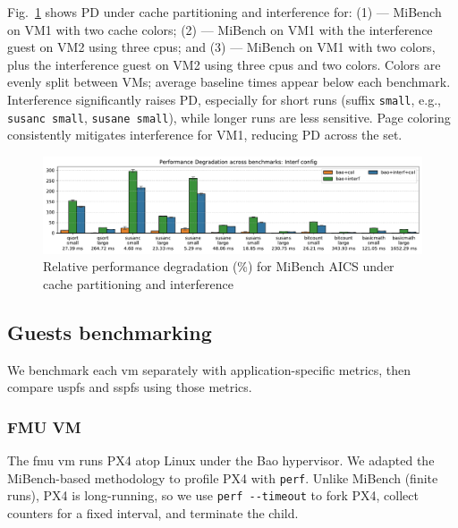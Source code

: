 Fig.~\ref{fig:plot-performDeg-Interf} shows PD under cache partitioning and interference for:
(1)  — MiBench on VM1 with two cache colors;
(2)  — MiBench on VM1 with the interference guest on VM2 using three \glspl{cpu}; and
(3)  — MiBench on VM1 with two colors, plus the interference guest on VM2 using three \glspl{cpu} and two colors.
Colors are evenly split between VMs; average baseline times appear below each benchmark. Interference significantly raises PD, especially for short runs (suffix \lstinline{small}, e.g., \lstinline{susanc small}, \lstinline{susane small}), while longer runs are less sensitive. Page coloring consistently mitigates interference for VM1, reducing PD across the set.

\begin{figure}[!hbt]
  \centering
  \includegraphics[width=1.0\textwidth]{./img/pdf/plot-performDeg-Interf}
  \caption{Relative performance degradation (\%) for MiBench AICS under cache partitioning and interference}%
  \label{fig:plot-performDeg-Interf}
\end{figure}

\subsection{Guests benchmarking}
\label{sec:guests-benchmarking}
We benchmark each \gls{vm} separately with application-specific metrics, then compare \gls{uspfs} and \gls{sspfs} using those metrics.

\subsubsection{FMU VM}
\label{sec:fmu-vm}
The \gls{fmu} \gls{vm} runs PX4 atop Linux under the Bao hypervisor. We adapted
the MiBench-based methodology to profile PX4 with \lstinline{perf}. Unlike
MiBench (finite runs), PX4 is long-running, so we use \lstinline{perf --timeout}
to fork PX4, collect counters for a fixed interval, and terminate the child.

